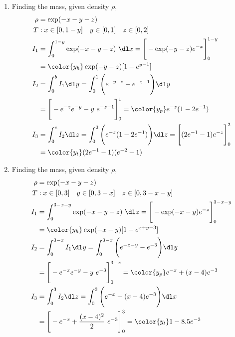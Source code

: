 \begin{enumerate}
    \item Finding the mass, given density $ \rho $,
          \begin{align}
              \rho & = \exp(-x-y-z)                                         \\
              T    & : x \in [0, 1-y] \quad y \in [0, 1] \quad z \in [0, 2] \\
              I_1  & = \int_{0}^{1-y} \exp(-x-y-z)\ \dl x
              = \Bigg[ -\exp(-y-z)e^{-x} \Bigg]_{0}^{1-y}                   \\
                   & = {\color{y_h} \exp(-y-z) [1 - e^{y-1}]}               \\
              I_2  & = \int_{0}^{b}I_1 \dl y = \int_{0}^{1}
              \Bigg( e^{-y-z} - e^{-z-1} \Bigg) \dl y                       \\
                   & = \Bigg[ -e^{-z}e^{-y} - y\ e^{-z-1} \Bigg]_{0}^{1}
              = {\color{y_p} e^{-z} (1 - 2e^{-1})}                          \\
              I_3  & = \int_{0}^{c} I_2 \dl z = \int_{0}^{2}
              \Bigg( e^{-z} (1 - 2e^{-1}) \Bigg) \dl z
              = \Bigg[ (2e^{-1} - 1)e^{-z} \Bigg]_0^2                       \\
                   & = {\color{y_t} (2e^{-1} - 1)(e^{-2} - 1)}
          \end{align}

    \item Finding the mass, given density $ \rho $,
          \begin{align}
              \rho & = \exp(-x-y-z)                                             \\
              T    & : x \in [0, 3] \quad y \in [0, 3-x] \quad z \in [0, 3-x-y] \\
              I_1  & = \int_{0}^{3-x-y} \exp(-x-y-z)\ \dl z
              = \Bigg[ -\exp(-x-y)e^{-z} \Bigg]_{0}^{3-x-y}                     \\
                   & = {\color{y_h} \exp(-x-y) [1 - e^{x+y-3}]}                 \\
              I_2  & = \int_{0}^{3-x}I_1 \dl y = \int_{0}^{3-x}
              \Bigg( e^{-x-y} - e^{-3} \Bigg) \dl y                             \\
                   & = \Bigg[ -e^{-x}e^{-y} - y\ e^{-3} \Bigg]_{0}^{3-x}
              = {\color{y_p} e^{-x} + (x-4)e^{-3}}                              \\
              I_3  & = \int_{0}^{3} I_2 \dl z = \int_{0}^{3}
              \Bigg( e^{-x} + (x-4)e^{-3} \Bigg) \dl x                          \\
                   & = \Bigg[ -e^{-x} + \frac{(x-4)^2}{2}\ e^{-3} \Bigg]_0^3
              = {\color{y_t} 1 - 8.5e^{-3}}
          \end{align}


\end{enumerate}
